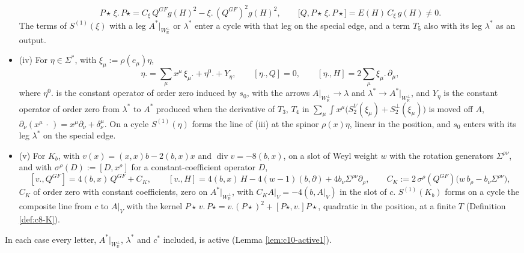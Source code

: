 \begin{lemma}
\begin{itemize}
\[
P\star\,\xi.\,P\star=C_\xi\,Q^{GF}g(H)^2-\xi.\,(Q^{GF})^2g(H)^2,\qquad \big[Q,P\star\,\xi.\,P\star\big]=E(H)\,C_\xi\,g(H)\neq0 .
\]
The terms of $S^{(1)}(\xi)$ with a leg $A^*|_{W_{\mathbb R}^\perp}$ or $\lambda^*$ enter a cycle with that leg on the special edge, and a term $T_5$ also with its leg $\lambda^*$ as an output.
\item (iv) For $\eta\in\Sigma^*$, with $\xi_\mu:=\rho(e_\mu)\eta$,
\[
\eta.=\sum_\mu x^\mu\,\xi_\mu.+\eta^0.+Y_\eta,\qquad [\eta.,Q]=0,\qquad [\eta.,H]=2\sum_\mu\xi_\mu.\,\partial_\mu,
\]
where $\eta^0.$ is the constant operator of order zero induced by $s_0$, with the arrows $A|_{W_{\mathbb R}^\perp}\to\lambda$ and $\lambda^*\to A^*|_{W_{\mathbb R}^\perp}$, and $Y_\eta$ is the constant operator of order zero from $\lambda^*$ to $A^*$ produced when the derivative of $T_3$, $T_4$ in $\sum_\mu\int x^\mu\big(S^V_2(\xi_\mu)+S^\perp_2(\xi_\mu)\big)$ is moved off $A$, $\partial_\nu(x^\mu\,\cdot\,)=x^\mu\partial_\nu+\delta^\mu_\nu$. On a cycle $S^{(1)}(\eta)$ forms the line of (iii) at the spinor $\rho(x)\eta$, linear in the position, and $s_0$ enters with its leg $\lambda^*$ on the special edge.
\item (v) For $K_b$, with $v(x)=(x,x)b-2(b,x)x$ and $\operatorname{div}v=-8(b,x)$, on a slot of Weyl weight $w$ with the rotation generators $\Sigma^{\rho\nu}$, and with $\sigma^\rho(D):=[D,x^\rho]$ for a constant-coefficient operator $D$,
\[
[v.,Q^{GF}]=4(b,x)\,Q^{GF}+C_K,\qquad [v.,H]=4(b,x)\,H-4(w-1)(b,\partial)+4b_\nu\Sigma^{\rho\nu}\partial_\rho,\qquad C_K:=2\,\sigma^\rho(Q^{GF})\big(w\,b_\rho-b_\nu\Sigma^{\rho\nu}\big),
\]
$C_K$ of order zero with constant coefficients, zero on $A^*|_{W_{\mathbb R}^\perp}$, with $C_KA|_V=-4(b,A|_V)$ in the slot of $c$. $S^{(1)}(K_b)$ forms on a cycle the composite line from $c$ to $A|_V$ with the kernel $P\star\,v.\,P\star=v.(P\star)^2+[P\star,v.]P\star$, quadratic in the position, at a finite $T$ (Definition \ref{def:c8-K}).
\end{itemize}
In each case every letter, $A^*|_{W_{\mathbb R}^\perp}$, $\lambda^*$ and $c^*$ included, is active (Lemma \ref{lem:c10-active1}).
\end{lemma}

